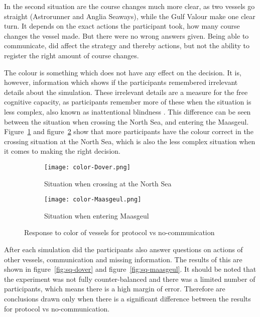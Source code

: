 In the second situation are the course changes much more clear, as two vessels go straight (Astrorunner and Anglia Seaways), while the Gulf Valour make one clear turn. It depends on the exact actions the participant took, how many course changes the vessel made. But there were no wrong answers given. 
Being able to communicate, did affect the strategy and thereby actions, but not the ability to register the right amount of course changes.

The colour is something which does not have any effect on the decision. It is, however, information which shows if the participants remembered irrelevant details about the simulation. These irrelevant details are a measure for the free cognitive capacity, as participants remember more of these when the situation is less complex, also known as inattentional blindness \cite{Most2000}. This difference can be seen between the situation when crossing the North Sea, and entering the Maasgeul. Figure~\ref{fig:color-dover} and figure~\ref{fig:color-maasgeul} show that more participants have the colour correct in the crossing situation at the North Sea, which is also the less complex situation when it comes to making the right decision.

\begin{figure}[hbtp]
	\centering
	\begin{subfigure}[b]{0.8\textwidth}
		\texttt{[image: color-Dover.png]}
		\caption{Situation when crossing at the North Sea}
		\label{fig:color-dover}
	\end{subfigure}
	
	\begin{subfigure}[b]{0.8\textwidth}
		\centering
		\texttt{[image: color-Maasgeul.png]}
		\caption{Situation when entering Maasgeul}
		\label{fig:color-maasgeul}
	\end{subfigure}
	
	\caption{Response to color of vessels for protocol vs no-communication}
	\label{fig:experiment-color} 
\end{figure}

After each simulation did the participants also answer questions on actions of other vessels, communication and missing information. The results of this are shown in figure~\ref{fig:sq-dover} and figure~\ref{fig:sq-maasgeul}. It should be noted that the experiment was not fully counter-balanced and there was a limited number of participants, which means there is a high margin of error. Therefore are conclusions drawn only when there is a significant difference between the results for protocol vs no-communication. 

